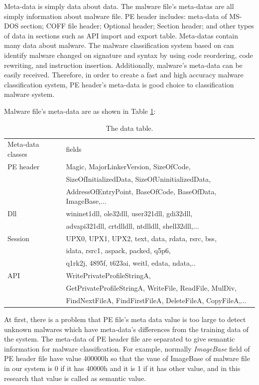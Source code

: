 Meta-data is simply data about data. The malware file's meta-datas are all simply information about malware file. PE header includes: meta-data of MS-DOS section; COFF file header; Optional header; Section header; and other types of data in sections such as API import and export table. Meta-datas contain many data about malware. The malware classification system based on can identify malware changed on signature and syntax by using code reordering, code rewriting, and instruction insertion. Additionally, malware's meta-data can be easily received. Therefore, in order to create a fast and high accuracy malware classification system, PE header's meta-data is good choice to classification malware system. 

Malware file's meta-data are as shown in Table \ref{table:metadata}:
\begin{table}
\begin{center}
    \begin{tabular}{ | l | l |}
     \hline
    Meta-data classes & fields \\
  PE header & Magic, MajorLinkerVersion, SizeOfCode,\\
  & SizeOfInitializedData, SizeOfUninitializedData,  \\
 & AddressOfEntryPoint, BaseOfCode, BaseOfData, ImageBase,... \\ 
 \hline
	Dll &   wininet1dll, ole32dll, user321dll, gdi32dll,\\ 
	 & advapi321dll, crtdlldll, ntdlldll, shell32dll,...\\ 
	 \hline
	Session &  UPX0, UPX1, UPX2, text, data, rdata, rsrc, bss, \\
 & idata, rsrc1, aspack, packed, q5p6, \\
 & q1rk2j, 4895f, t623ai, weitl, edata, ndata,.. \\ 
 \hline
	API &  WritePrivateProfileStringA, \\
& GetPrivateProfileStringA, WriteFile, ReadFile, MulDiv,\\
& FindNextFileA, FindFirstFileA, DeleteFileA, CopyFileA,...\\  
 \hline
    \end{tabular}
	\end{center}
     \caption{The data table.}
    \label{table:metadata}
\end{table}

At first, there is a problem that PE file's meta data value is too large to detect unknown malwares which have meta-data's differences from the training data of the system. The meta-data of PE header file are separated  to give semantic information for malware classification. For example, normally \emph{ImageBase} field of PE header file have value 400000h \cite{goppit} so that the vaue of ImageBase of malware file in our system is 0 if it has 40000h and it is 1 if it has other value, and in this research that value is called as semantic value. 

